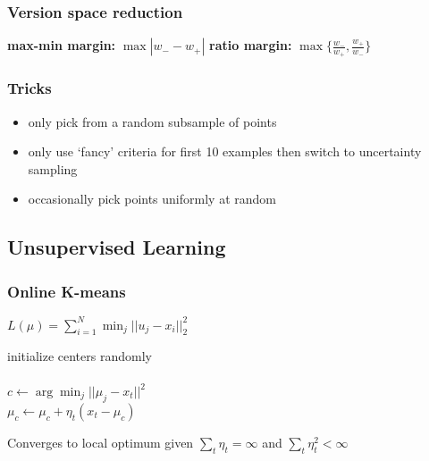 \documentclass[7pt,parskip]{scrartcl}
\begin{document}
\begin{multicols*}{3}
\subsubsection{Version space reduction} %
\label{ssub:version_space_reduction}
\textbf{max-min margin: } $\max |w_- - w_+|$ \quad \textbf{ratio margin: } $\max \{\frac{w_-}{w_+},\frac{w_+}{w_-} \}$
\subsubsection{Tricks} %
\label{ssub:tricks}
\begin{itemize}
	\item only pick from a random subsample of points
	\item only use `fancy' criteria for first 10 examples then switch to uncertainty sampling 
	\item occasionally pick points uniformly at random
\end{itemize}

\subsection{Unsupervised Learning} %
\label{sub:unsupervised_learning}
\subsubsection{Online K-means} %
\label{ssub:k_means}

$L(\mu) = \sum_{i=1}^N \min_j ||u_j - x_i||_2^2$

\begin{mdframed}
	\begin{algorithmic}
		\State initialize centers randomly \\
		 \\
			\State $c \gets \arg\min_j||\mu_j-x_t||^2$ \\
			\State $\mu_c \gets \mu_c + \eta_t(x_t-\mu_c)$
		\EndFor
	\end{algorithmic}
\end{mdframed}
Converges to local optimum given $\sum_t \eta_t = \infty$ and $\sum_t \eta_t^2 < \infty$

\end{multicols*}
\end{document}
